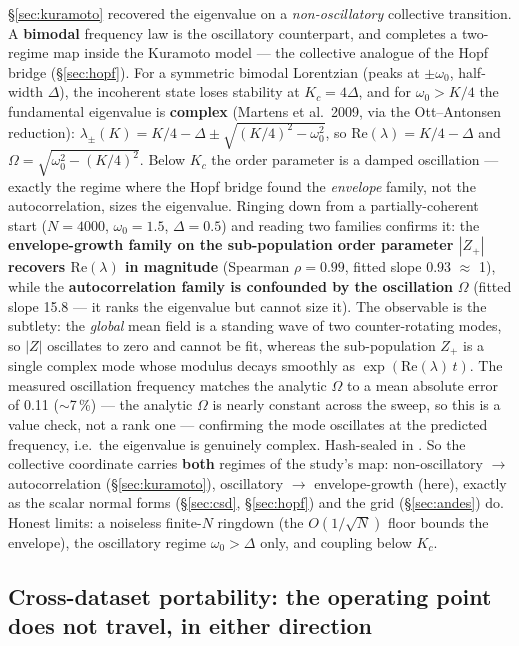 \documentclass[11pt]{article}
\begin{document}
\S\ref{sec:kuramoto} recovered the eigenvalue on a \emph{non-oscillatory}
collective transition. A \textbf{bimodal} frequency law is the
oscillatory counterpart, and completes a two-regime map inside the
Kuramoto model --- the collective analogue of the Hopf bridge
(\S\ref{sec:hopf}). For a symmetric bimodal Lorentzian (peaks at
$\pm\omega_0$, half-width $\Delta$), the incoherent state loses
stability at $K_c = 4\Delta$, and for $\omega_0 > K/4$ the fundamental
eigenvalue is \textbf{complex} (Martens et al.\ 2009, via the
Ott--Antonsen reduction):
$\lambda_{\pm}(K) = K/4 - \Delta \pm \sqrt{(K/4)^2 - \omega_0^2}$, so
$\mathrm{Re}(\lambda) = K/4 - \Delta$ and
$\Omega = \sqrt{\omega_0^2 - (K/4)^2}$. Below $K_c$ the order parameter
is a damped oscillation --- exactly the regime where the Hopf bridge
found the \emph{envelope} family, not the autocorrelation, sizes the
eigenvalue. Ringing down from a partially-coherent start ($N = 4000$,
$\omega_0 = 1.5$, $\Delta = 0.5$) and reading two families confirms it:
the \textbf{envelope-growth family on the sub-population order parameter
$|Z_+|$ recovers $\mathrm{Re}(\lambda)$ in magnitude} (Spearman
$\rho = 0.99$, fitted slope 0.93 $\approx$ 1), while the
\textbf{autocorrelation family is confounded by the oscillation}
$\Omega$ (fitted slope 15.8 --- it ranks the eigenvalue but cannot size
it). The observable is the subtlety: the \emph{global} mean field is a
standing wave of two counter-rotating modes, so $|Z|$ oscillates to zero
and cannot be fit, whereas the sub-population $Z_+$ is a single complex
mode whose modulus decays smoothly as $\exp(\mathrm{Re}(\lambda)\,t)$.
The measured oscillation frequency matches the analytic $\Omega$ to a
mean absolute error of 0.11 ($\sim$7\,\%) --- the analytic $\Omega$ is
nearly constant across the sweep, so this is a value check, not a rank
one --- confirming the mode oscillates at the predicted frequency, i.e.\
the eigenvalue is genuinely complex. Hash-sealed in
.
So the collective coordinate carries \textbf{both} regimes of the
study's map: non-oscillatory $\to$ autocorrelation
(\S\ref{sec:kuramoto}), oscillatory $\to$ envelope-growth (here),
exactly as the scalar normal forms (\S\ref{sec:csd}, \S\ref{sec:hopf})
and the grid (\S\ref{sec:andes}) do. Honest limits: a noiseless
finite-$N$ ringdown (the $O(1/\sqrt{N})$ floor bounds the envelope),
the oscillatory regime $\omega_0 > \Delta$ only, and coupling below
$K_c$.

\subsection{Cross-dataset portability: the operating point does not
travel, in either direction}\label{sec:portability}
\end{document}
